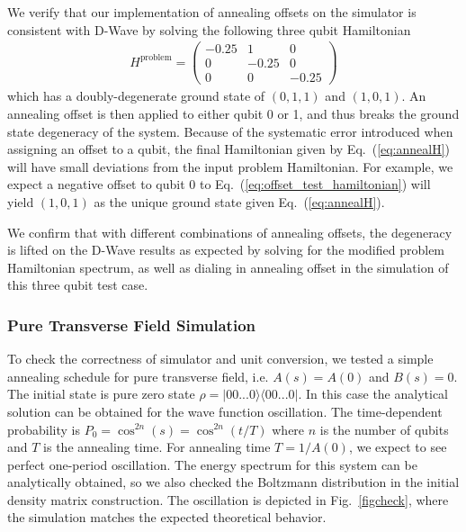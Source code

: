 \documentclass[10pt]{iopart}
\begin{document}
We verify that our implementation of annealing offsets on the simulator is consistent with D-Wave by solving the following three qubit Hamiltonian
\begin{align}
	\label{eq:offset_test_hamiltonian}
	H^{\textrm{problem}} =
	\begin{pmatrix}
		-0.25 & 1 & 0 \\
		0 & -0.25 & 0 \\
		0 & 0 & -0.25
	\end{pmatrix}
\end{align}
which has a doubly-degenerate ground state of $(0, 1, 1)$ and $(1, 0, 1)$. An annealing offset is then applied to either qubit 0 or 1, and thus breaks the ground state degeneracy of the system. Because of the systematic error introduced when assigning an offset to a qubit, the final Hamiltonian given by Eq.~(\ref{eq:annealH}) will have small deviations from the input problem Hamiltonian. For example, we expect a negative offset to qubit 0 to Eq.~(\ref{eq:offset_test_hamiltonian}) will yield $(1, 0, 1)$ as the unique ground state given Eq.~(\ref{eq:annealH}).

We confirm that with different combinations of annealing offsets, the degeneracy is lifted on the D-Wave results as expected by solving for the modified problem Hamiltonian spectrum, as well as dialing in annealing offset in the simulation of this three qubit test case.


\subsubsection{Pure Transverse Field Simulation}
\label{sec:methods:simulation_details}
To check the correctness of simulator and unit conversion, we tested a simple annealing schedule for pure transverse field, i.e. $A(s)=A(0)$ and $B(s)=0$.
The initial state is pure zero state $\rho=|00...0\rangle \langle 00...0|$.
In this case the analytical solution can be obtained for the wave function oscillation.
The time-dependent probability is $P_{0}=\cos^{2n}(s)=\cos^{2n}(t/T)$ where $n$ is the number of qubits and $T$ is the annealing time.
For annealing time $T=1/A(0)$, we expect to see perfect one-period oscillation. The energy spectrum for this system can be analytically obtained, so we also checked the Boltzmann distribution in the initial density matrix construction. The oscillation is depicted in Fig.~\ref{figcheck}, where the simulation matches the expected theoretical behavior.
\end{document}
